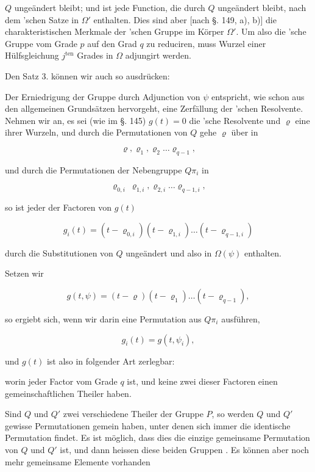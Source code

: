 $Q$ ungeändert bleibt; und  ist jede Function, die
durch $Q$ ungeändert bleibt, nach dem 'schen Satze in
$\Omega'$ enthalten. Dies sind aber [nach §. 149, a), b)] die charakteristischen
 Merkmale der 'schen Gruppe im Körper $\Omega'$.
Um also die 'sche Gruppe vom Grade $p$ auf den Grad $q$
zu reduciren, muss  Wurzel einer Hülfsgleichung $j^{\text{ten}}$ Grades
in $\Omega$ adjungirt werden.

Den Satz 3. können wir auch so ausdrücken:


Der Erniedrigung der Gruppe durch Adjunction von $\psi$ entspricht,
wie schon aus den allgemeinen Grundsätzen hervorgeht,
eine Zerfällung der 'schen Resolvente. Nehmen wir an,
es sei (wie im §. 145) $g(t) = 0$ die 'sche Resolvente und
$\varrho$ eine ihrer Wurzeln, und durch die Permutationen von $Q$ gehe
$\varrho$ über in

\[
\varrho, \varrho_1, \varrho_2 \ldots \varrho_{q-1},
\]

und durch die Permutationen der Nebengruppe $Q\pi_i$ in

\[
\varrho_{0,i}\ \varrho_{1,i}, \varrho_{2,i} \ldots \varrho_{q-1,i},
\]

so ist jeder der Factoren von $g(t)$

\[
g_i(t) = (t - \varrho_{0,i})(t - \varrho_{1,i}) \ldots (t - \varrho_{q-1,i})
\]

durch die Substitutionen von $Q$ ungeändert und also in $\Omega(\psi)$
enthalten.

Setzen wir

\[
g(t, \psi) = (t - \varrho)(t - \varrho_1) \ldots (t - \varrho_{q-1}),
\]

so ergiebt sich, wenn wir darin eine Permutation aus $Q\pi_i$ ausführen,

\[
g_i(t) = g(t, \psi_i),
\]

und $g(t)$ ist also in folgender Art zerlegbar:


worin jeder Factor vom Grade $q$ ist, und keine zwei dieser
Factoren einen gemeinschaftlichen Theiler haben.

Sind $Q$ und $Q'$ zwei verschiedene Theiler der Gruppe $P$, so
werden $Q$ und $Q'$ gewisse Permutationen gemein haben, unter
denen sich immer die identische Permutation findet. Es ist
möglich, dass dies die einzige gemeinsame Permutation von $Q$
und $Q'$ ist, und dann heissen diese beiden Gruppen .
Es können aber noch mehr gemeinsame Elemente vorhanden
